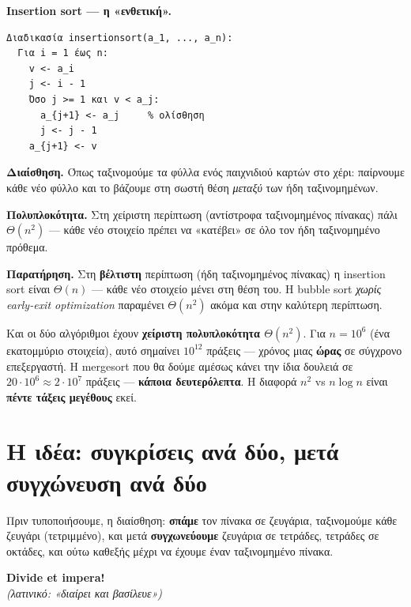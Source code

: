 \documentclass[11pt,a4paper]{article}
\begin{document}
\begin{examplebox}
\textbf{Insertion sort --- η «ενθετική».}
\begin{codebox}
\begin{verbatim}
Διαδικασία insertionsort(a_1, ..., a_n):
  Για i = 1 έως n:
    v <- a_i
    j <- i - 1
    Όσο j >= 1 και v < a_j:
      a_{j+1} <- a_j     % ολίσθηση
      j <- j - 1
    a_{j+1} <- v
\end{verbatim}
\end{codebox}
\textbf{Διαίσθηση.} Όπως ταξινομούμε τα φύλλα ενός παιχνιδιού καρτών στο χέρι:
παίρνουμε κάθε νέο φύλλο και το βάζουμε στη σωστή θέση \textit{μεταξύ} των ήδη
ταξινομημένων.

\textbf{Πολυπλοκότητα.} Στη χείριστη περίπτωση (αντίστροφα ταξινομημένος πίνακας)
πάλι $\Theta(n^2)$ --- κάθε νέο στοιχείο πρέπει να «κατέβει» σε όλο τον ήδη
ταξινομημένο πρόθεμα.

\textbf{Παρατήρηση.} Στη \textbf{βέλτιστη} περίπτωση (ήδη ταξινομημένος πίνακας)
η insertion sort είναι $\Theta(n)$ --- κάθε νέο στοιχείο μένει στη θέση του. Η
bubble sort \textit{χωρίς early-exit optimization} παραμένει $\Theta(n^2)$ ακόμα
και στην καλύτερη περίπτωση.
\end{examplebox}

\begin{warningbox}
Και οι δύο αλγόριθμοι έχουν \textbf{χείριστη πολυπλοκότητα $\Theta(n^2)$}. Για
$n = 10^6$ (ένα εκατομμύριο στοιχεία), αυτό σημαίνει $10^{12}$ πράξεις --- χρόνος
μιας \textbf{ώρας} σε σύγχρονο επεξεργαστή. Η mergesort που θα δούμε αμέσως κάνει
την ίδια δουλειά σε $20 \cdot 10^6 \approx 2 \cdot 10^7$ πράξεις --- \textbf{κάποια
δευτερόλεπτα}. Η διαφορά $n^2$ vs $n \log n$ είναι \textbf{πέντε τάξεις μεγέθους}
εκεί.
\end{warningbox}

\section{Η ιδέα: συγκρίσεις ανά δύο, μετά συγχώνευση ανά δύο}

Πριν τυποποιήσουμε, η διαίσθηση: \textbf{σπάμε} τον πίνακα σε ζευγάρια,
ταξινομούμε κάθε ζευγάρι (τετριμμένο), και μετά \textbf{συγχωνεύουμε} ζευγάρια σε
τετράδες, τετράδες σε οκτάδες, και ούτω καθεξής μέχρι να έχουμε έναν ταξινομημένο
πίνακα.

\begin{quoteblock}
\textbf{\large Divide et impera!}\\
\textit{(λατινικό: «διαίρει και βασίλευε»)}
\end{quoteblock}
\end{document}

